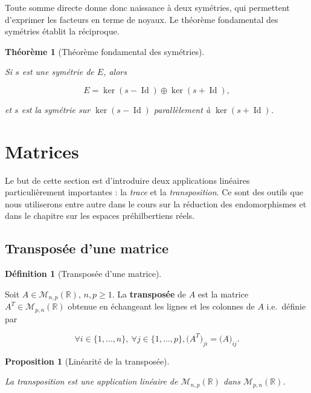 \documentclass[
  french,
  letterpaper,
  DIV=11,
  numbers=noendperiod]{scrreprt}
\theoremstyle{plain}
\theoremstyle{definition}
\newtheorem{definition}{Définition}[chapter]
\theoremstyle{plain}
\newtheorem{proposition}{Proposition}[chapter]
\theoremstyle{plain}
\newtheorem{theorem}{Théorème}[chapter]
\theoremstyle{definition}
\theoremstyle{definition}
\theoremstyle{plain}
\theoremstyle{remark}
\begin{document}
Toute somme directe donne donc naissance à deux symétries, qui
permettent d'exprimer les facteurs en terme de noyaux. Le théorème
fondamental des symétries établit la réciproque.

\begin{theorem}[Théorème fondamental des
symétries]\protect\hypertarget{thm-symetrie}{}\label{thm-symetrie}

Si \(s\) est une symétrie de \(E\), alors

\[
    E = \ker(s-\operatorname{Id}) \oplus \ker(s+\operatorname{Id}),
\]

et \(s\) est la symétrie sur \(\ker (s-\operatorname{Id})\)
parallèlement à \(\ker(s+\operatorname{Id})\).

\end{theorem}

\section{Matrices}\label{sec-03-matrices}

Le but de cette section est d'introduire deux applications linéaires
particulièrement importantes : la \emph{trace} et la
\emph{transposition}. Ce sont des outils que nous utiliserons entre
autre dans le cours sur la réduction des endomorphismes et dans le
chapitre sur les espaces préhilbertiens réels.

\subsection{Transposée d'une matrice}\label{transposuxe9e-dune-matrice}

\begin{definition}[Transposée d'une
matrice]\protect\hypertarget{def-transpose}{}\label{def-transpose}

Soit \(A \in \mathcal{M}_{n,p}(\mathbb{R})\), \(n,p \geqslant 1\). La
\textbf{transposée} de \(A\) est la matrice
\(A^{T}\in \mathcal{M}_{p,n}(\mathbb{R})\) obtenue en échangeant les
lignes et les colonnes de \(A\) i.e.~définie par

\[
\forall i \in \{1,\dots,n\},\ \forall j \in \{1,\dots,p\}, \bigl( A^{T}\bigr)_{ji} = \bigl( A\bigr)_{ij}.
\]

\end{definition}

\begin{proposition}[Linéarité de la
transposée]\protect\hypertarget{prp-linearité-transpose}{}\label{prp-linearité-transpose}

La transposition est une application linéaire de
\(\mathcal{M}_{n,p}(\mathbb{R})\) dans
\(\mathcal{M}_{p,n}(\mathbb{R})\).

\end{proposition}
\end{document}
